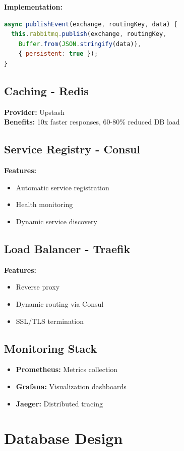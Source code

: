\documentclass[12pt,a4paper]{article}
\begin{document}
\textbf{Implementation:}
\begin{lstlisting}[language=JavaScript]
async publishEvent(exchange, routingKey, data) {
  this.rabbitmq.publish(exchange, routingKey,
    Buffer.from(JSON.stringify(data)),
    { persistent: true });
}
\end{lstlisting}

\subsection{Caching - Redis}
\textbf{Provider:} Upstash \\
\textbf{Benefits:} 10x faster responses, 60-80\% reduced DB load

\subsection{Service Registry - Consul}
\textbf{Features:}
\begin{itemize}
    \item Automatic service registration
    \item Health monitoring
    \item Dynamic service discovery
\end{itemize}

\subsection{Load Balancer - Traefik}
\textbf{Features:}
\begin{itemize}
    \item Reverse proxy
    \item Dynamic routing via Consul
    \item SSL/TLS termination
\end{itemize}

\subsection{Monitoring Stack}
\begin{itemize}
    \item \textbf{Prometheus:} Metrics collection
    \item \textbf{Grafana:} Visualization dashboards
    \item \textbf{Jaeger:} Distributed tracing
\end{itemize}

\section{Database Design}
\end{document}
